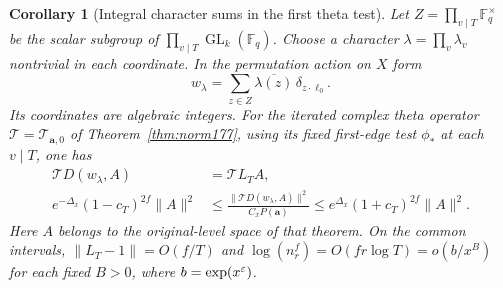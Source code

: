 \documentclass[a4paper,11pt]{article}
\newtheorem{corollary}[proposition]{Corollary}
\theoremstyle{definition}
\theoremstyle{remark}
\numberwithin{equation}{section}
\newcommand{\GL}{\operatorname{GL}}
\begin{document}
\begin{corollary}[Integral character sums in the first theta test]
\label{cor:theta199}
Let \(Z=\prod_{v\mid T}\mathbb F_q^\times\) be the scalar
subgroup of \(\prod_{v\mid T}\GL_k(\mathbb F_q)\).
Choose a character \(\lambda=\prod_v\lambda_v\) nontrivial in
each coordinate. In the permutation action on \(X\) form
\begin{equation}
        w_\lambda=\sum_{z\in Z}\overline{\lambda(z)}
                      \,\delta_{z\cdot\ell_0}.
                                                  \label{eq:word199}
\end{equation}
Its coordinates are algebraic integers. For the iterated
complex theta operator \(\mathcal T=\mathcal T_{\mathbf a,0}\)
of Theorem~\ref{thm:norm177}, using its fixed first-edge test
\(\phi_*\) at each \(v\mid T\), one has
\begin{equation}
 \begin{split}
  \mathcal T D(w_\lambda,A)&=\mathcal T L_T A,\\
 e^{-\Delta_x}(1-c_T)^{2f}\|A\|^2
       &\le \frac{\|\mathcal T D(w_\lambda,A)\|^2}{C_xP(\mathbf a)}
        \le e^{\Delta_x}(1+c_T)^{2f}\|A\|^2 .
 \end{split}                                       \label{eq:theta199}
\end{equation}
Here \(A\) belongs to the original-level space of that theorem.
On the common intervals, \(\|L_T-1\|=O(f/T)\) and
\(\log(n_r^f)=O(fr\log T)=o(b/x^B)\) for each fixed \(B>0\),
where \(b=\exp(x^\varepsilon)\).
\end{corollary}
\end{document}
